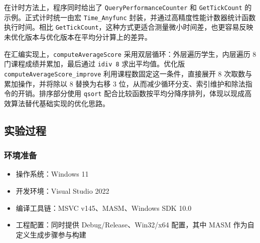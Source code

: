 \documentclass[supercite]{Experimental_Report}
\theoremstyle{definition}
\begin{document}
在计时方法上，程序同时给出了 \texttt{QueryPerformanceCounter} 和 \texttt{GetTickCount} 的示例。正式计时统一由宏 \texttt{Time\_Anyfunc} 封装，并通过高精度性能计数器统计函数执行时间。相比 \texttt{GetTickCount}，这种方式更适合测量微小时间差，也更容易反映未优化版本与优化版本在平均分计算上的差异。

在汇编实现上，\texttt{computeAverageScore} 采用双层循环：外层遍历学生，内层遍历 8 门课程成绩并累加，最后通过 \texttt{idiv 8} 求出平均值。优化版 \texttt{computeAverageScore\_improve} 利用课程数固定这一条件，直接展开 8 次取数与累加操作，并将除以 8 替换为右移 3 位，从而减少循环分支、索引维护和除法指令的开销。排序部分使用 \texttt{qsort} 配合比较函数按平均分降序排列，体现以现成高效算法替代基础实现的优化思路。

\subsection{实验过程}
\subsubsection{环境准备}
\begin{itemize}
  \item 操作系统：Windows 11
  \item 开发环境：Visual Studio 2022
  \item 编译工具链：MSVC v145、MASM、Windows SDK 10.0
  \item 工程配置：同时提供 Debug/Release、Win32/x64 配置，其中 MASM 作为自定义生成步骤参与构建
\end{itemize}
\end{document}
